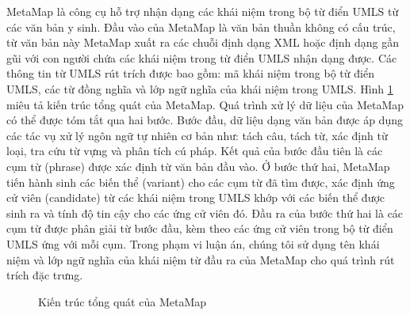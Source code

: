 MetaMap là công cụ hỗ trợ nhận dạng các khái niệm trong bộ từ điển UMLS từ các văn bản y sinh. Đầu vào của MetaMap là văn bản thuần không có cấu trúc, từ văn bản này MetaMap xuất ra các chuỗi định dạng XML hoặc định dạng gần gũi với con người chứa các khái niệm trong từ điển UMLS nhận dạng được. Các thông tin từ UMLS rút trích được bao gồm: mã khái niệm trong bộ từ điển UMLS, các từ đồng nghĩa và lớp ngữ nghĩa của khái niệm trong UMLS. Hình \ref{metamapstructure} miêu tả kiến trúc tổng quát của MetaMap. Quá trình xử lý dữ liệu của MetaMap có thể được tóm tắt qua hai bước. Bước đầu, dữ liệu dạng văn bản được áp dụng các tác vụ xử lý ngôn ngữ tự nhiên cơ bản như: tách câu, tách từ, xác định từ loại, tra cứu từ vựng và phân tích cú pháp. Kết quả của bước đầu tiên là các cụm từ (phrase) được xác định từ văn bản đầu vào. Ở bước thứ hai, MetaMap tiến hành sinh các biến thể (variant) cho các cụm từ đã tìm được, xác định ứng cử viên (candidate) từ các khái niệm trong UMLS khớp với các biến thể được sinh ra và tính độ tin cậy cho các ứng cử viên đó. Đầu ra của bước thứ hai là các cụm từ được phân giải từ bước đầu, kèm theo các ứng cử viên trong bộ từ điển UMLS ứng với mỗi cụm. Trong phạm vi luận án, chúng tôi sử dụng tên khái niệm và lớp ngữ nghĩa của khái niệm từ đầu ra của MetaMap cho quá trình rút trích đặc trưng.

\begin{figure}[t]
\centering
{}
\caption{Kiến trúc tổng quát của MetaMap\label{metamapstructure}}
\end{figure}

